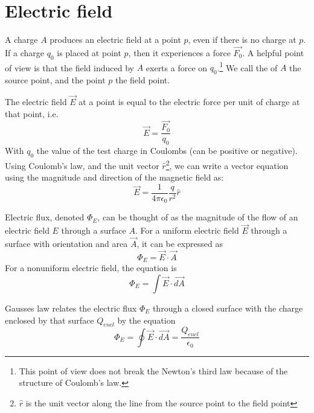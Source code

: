 \documentclass[nobib,notoc]{tufte-handout}
\begin{document}
\section{Electric field}
A charge \(A\) produces an electric field at a point \(p\), even if there is no charge at \(p\). If a charge \(q_0\) is placed at point \(p\), then it experiences a force \(\vec{F_0}\). A helpful point of view is that the field induced by \(A\) exerts a force on \(q_0\).\footnote{This point of view does not break the Newton's third law because of the structure of Coulomb's law.} We call the of \(A\) the source point, and the point \(p\) the field point.
\begin{defi}
	The electric field \(\vec{E}\) at a point is equal to the electric force per unit of charge at that point, i.e.
	\begin{equation*}
		\vec{E}=\frac{\vec{F_0}}{q_0}
	\end{equation*}
	With \(q_0\) the value of the test charge in Coulombs (can be positive or negative). Using Coulomb's law, and the unit vector \(\hat{r}\)\footnote{\(\hat{r}\) is the unit vector along the line from the source point to the field point}, we can write a vector equation using the magnitude and direction of the magnetic field as:
	\begin{equation*}
		\vec{E}=\frac{1}{4\pi\epsilon_0}\frac{q}{r^2}\hat{r}
	\end{equation*}
\end{defi}
\begin{defi}
	Electric flux, denoted \(\Phi_E\), can be thought of as the magnitude of the flow of an electric field \(E\) through a surface \(A\). For a uniform electric field \(\vec{E}\) through a surface with orientation and area \(\vec{A}\), it can be expressed as
	\begin{equation*}
		\Phi_E=\vec{E}\cdot\vec{A}
	\end{equation*}
For a nonuniform electric field, the equation is
	\begin{equation*}
		\Phi_E=\int \vec{E}\cdot\vec{dA}
	\end{equation*}
\end{defi}
\begin{defi}
	Gausses law relates the electric flux \(\Phi_{E}\) through a closed surface with the charge enclosed by that surface \(Q_{encl}\) by the equation
	\begin{equation*}
		\Phi_{E}=\oint \vec{E}\cdot\vec{dA}=\frac{Q_{encl}}{\epsilon_0}
	\end{equation*}
\end{defi}
\end{document}
